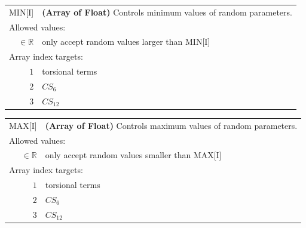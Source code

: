 \documentclass[10pt,a4paper,openany]{memoir}
\numberwithin{equation}{section}
\begin{document}
{
\begin{tabular}{r@{ : }l}
\label{descr:min}
       MIN[I]&\textbf{(Array of Float)} Controls minimum values of random parameters.                                                       \\ 
\multicolumn{2}{l}{Allowed values:} \\ 
\(\in\mathbb{R}\)&only accept random values larger than MIN[I]                                                                          \\ 
\multicolumn{2}{l}{Array index targets:} \\ 
     \(1\)&torsional terms                                                                                      \\ 
     \(2\)&$CS_6$                                                                                               \\ 
     \(3\)&$CS_{12}$                                                                                            \\ 
\end{tabular}
\vspace{1ex}
}

{
\begin{tabular}{r@{ : }l}
\label{descr:max}
       MAX[I]&\textbf{(Array of Float)} Controls maximum values of random parameters.                                                       \\ 
\multicolumn{2}{l}{Allowed values:} \\ 
\(\in\mathbb{R}\)&only accept random values smaller than MAX[I]                                                                          \\ 
\multicolumn{2}{l}{Array index targets:} \\ 
     \(1\)&torsional terms                                                                                      \\ 
     \(2\)&$CS_6$                                                                                               \\ 
     \(3\)&$CS_{12}$                                                                                            \\ 
\end{tabular}
\vspace{1ex}
}
\end{document}
